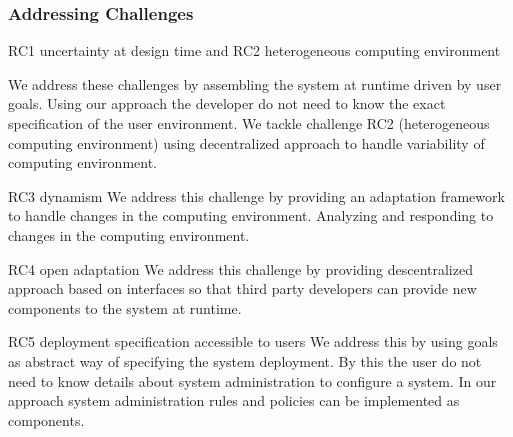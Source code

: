 \subsubsection{Addressing Challenges}
RC1 uncertainty at design time and RC2 heterogeneous computing environment

We address these challenges by assembling the system at runtime driven by user goals. Using our approach the developer do not need to know the exact specification of the user environment.
We tackle challenge RC2 (heterogeneous computing environment) using decentralized approach to handle variability of computing environment.

RC3 dynamism
We address this challenge by providing an adaptation framework to handle changes in the computing environment.
Analyzing and responding to changes in the computing environment.

RC4 open adaptation
We address this challenge by providing descentralized approach based on interfaces so that third party developers can provide new components to the system at runtime.


RC5 deployment specification accessible to users
We address this by using goals as abstract way of specifying the system deployment. By this the user do not need to know details about system administration to configure a system. In our approach system administration rules and policies can be implemented as components.
